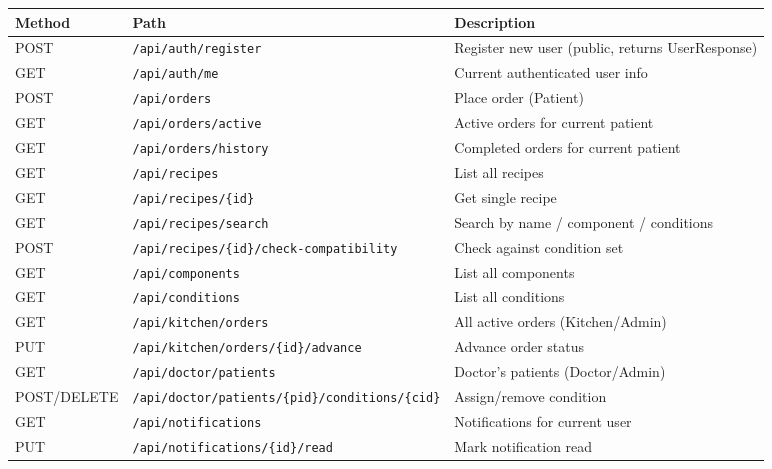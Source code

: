 \documentclass[12pt,a4paper]{article}
\begin{document}
\begin{center}
\begin{tabular}{lll}
\toprule
\textbf{Method} & \textbf{Path} & \textbf{Description} \\
\midrule
POST   & \texttt{/api/auth/register}          & Register new user (public, returns UserResponse) \\
GET    & \texttt{/api/auth/me}                & Current authenticated user info \\
POST   & \texttt{/api/orders}                 & Place order (Patient) \\
GET    & \texttt{/api/orders/active}          & Active orders for current patient \\
GET    & \texttt{/api/orders/history}         & Completed orders for current patient \\
GET    & \texttt{/api/recipes}                & List all recipes \\
GET    & \texttt{/api/recipes/\{id\}}          & Get single recipe \\
GET    & \texttt{/api/recipes/search}         & Search by name / component / conditions \\
POST   & \texttt{/api/recipes/\{id\}/check-compatibility} & Check against condition set \\
GET    & \texttt{/api/components}             & List all components \\
GET    & \texttt{/api/conditions}             & List all conditions \\
GET    & \texttt{/api/kitchen/orders}         & All active orders (Kitchen/Admin) \\
PUT    & \texttt{/api/kitchen/orders/\{id\}/advance} & Advance order status \\
GET    & \texttt{/api/doctor/patients}        & Doctor's patients (Doctor/Admin) \\
POST/DELETE & \texttt{/api/doctor/patients/\{pid\}/conditions/\{cid\}} & Assign/remove condition \\
GET    & \texttt{/api/notifications}          & Notifications for current user \\
PUT    & \texttt{/api/notifications/\{id\}/read} & Mark notification read \\
\bottomrule
\end{tabular}
\end{center}

\end{document}
